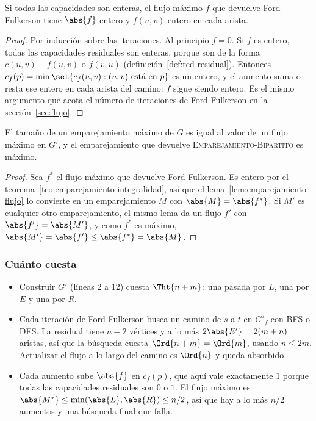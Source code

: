 \documentclass[11pt,letterpaper]{article}
\begin{document}
\begin{teorema}[Integralidad]
  \label{teo:emparejamiento-integralidad}
  Si todas las capacidades son enteras, el flujo máximo $f$ que
  devuelve Ford-Fulkerson tiene $\abs{f}$ entero y $f(u, v)$ entero
  en cada arista.
\end{teorema}

\begin{proof}
  Por inducción sobre las iteraciones. Al principio $f = 0$. Si $f$
  es entero, todas las capacidades residuales son enteras, porque son
  de la forma $c(u, v) - f(u, v)$ o $f(v, u)$
  (definición~\ref{def:red-residual}). Entonces
  $c_f(p) = \min\set{c_f(u, v) : (u, v) \text{ está en } p}$ es un
  entero, y el aumento suma o resta ese entero en cada arista del
  camino: $f$ sigue siendo entero. Es el mismo argumento que acota el
  número de iteraciones de Ford-Fulkerson en la
  sección~\ref{sec:flujo}.
\end{proof}

\begin{corolario}
  \label{cor:emparejamiento-flujo}
  El tamaño de un emparejamiento máximo de $G$ es igual al valor de un
  flujo máximo en $G'$, y el emparejamiento que devuelve
  \textup{\textsc{Emparejamiento-Bipartito}} es máximo.
\end{corolario}

\begin{proof}
  Sea $f^*$ el flujo máximo que devuelve Ford-Fulkerson. Es entero
  por el teorema~\ref{teo:emparejamiento-integralidad}, así que el
  lema~\ref{lem:emparejamiento-flujo} lo convierte en un
  emparejamiento $M$ con $\abs{M} = \abs{f^*}$. Si $M'$ es cualquier
  otro emparejamiento, el mismo lema da un flujo $f'$ con
  $\abs{f'} = \abs{M'}$, y como $f^*$ es máximo,
  $\abs{M'} = \abs{f'} \le \abs{f^*} = \abs{M}$.
\end{proof}

\subsubsection*{Cuánto cuesta}

\begin{itemize}
  \item Construir $G'$ (líneas 2 a 12) cuesta $\Tht{n + m}$: una
    pasada por $L$, una por $E$ y una por $R$.
  \item Cada iteración de Ford-Fulkerson busca un camino de $s$ a $t$
    en $G'_f$ con BFS o DFS. La residual tiene $n + 2$ vértices y a
    lo más $2\abs{E'} = 2(m + n)$ aristas, así que la búsqueda cuesta
    $\Ord{n + m} = \Ord{m}$, usando $n \le 2m$. Actualizar el flujo a
    lo largo del camino es $\Ord{n}$ y queda absorbido.
  \item Cada aumento sube $\abs{f}$ en $c_f(p)$, que aquí vale
    exactamente $1$ porque todas las capacidades residuales son $0$ o
    $1$. El flujo máximo es
    $\abs{M^*} \le \min(\abs{L}, \abs{R}) \le n/2$, así que hay a lo
    más $n/2$ aumentos y una búsqueda final que falla.
\end{itemize}
\end{document}
